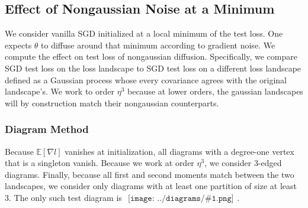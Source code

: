 \documentclass{article}
\newcommand{\expct}[1]{\mathbb{E}\left[#1\right]}
\newcommand{\sdia}[1]{\begin{gathered}\texttt{[image: ../diagrams/\#1.png]}\end{gathered}}
\begin{document}
    \subsection{Effect of Nongaussian Noise at a Minimum}
        We consider vanilla SGD initialized at a local minimum of the test loss.
        One expects $\theta$ to diffuse around that minimum according to
        gradient noise.  We compute the effect on test loss of nongaussian
        diffusion.  Specifically, we compare SGD test loss on the loss
        landscape to SGD test loss on a different loss landscape defined as a
        Gaussian process whose every covariance agrees with the original
        landscape's.  We work to order $\eta^3$ because at lower orders,
        the gaussian landscapes will by construction match their nongaussian
        counterparts.

        \subsubsection*{Diagram Method}
            Because $\expct{\nabla l}$ vanishes at initialization, all diagrams
            with a degree-one vertex that is a singleton vanish.  Because we
            work at order $\eta^3$, we consider $3$-edged diagrams.  Finally,
            because all first and second moments match between the two
            landscapes, we consider only diagrams with at least one partition
            of size at least $3$.  The only such test diagram is
            $\sdia{c(012-3)(03-13-23)}$.
\end{document}
